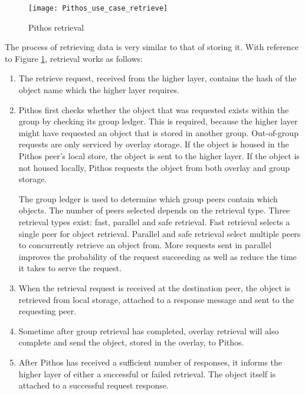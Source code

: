 \begin{figure}[htbp]
 \centering
 \texttt{[image: Pithos\_use\_case\_retrieve]}
 \caption{Pithos retrieval}
 \label{fig_pithos_retrieval}
\end{figure}
%
The process of retrieving data is very similar to that of storing it. With reference to Figure \ref{fig_pithos_retrieval}, retrieval works as follows:
%
\begin{enumerate}
\item The retrieve request, received from the higher layer, contains the hash of the object name which the higher layer requires.

\item Pithos first checks whether the object that was requested exists within the group by checking its group ledger. This is required, because the higher layer might have requested an object that is stored in another group. Out-of-group requests are only serviced by overlay storage. If the object is housed in the Pithos peer's local store, the object is sent to the higher layer. If the object is not housed locally, Pithos requests the object from both overlay and group storage.

    The group ledger is used to determine which group peers contain which objects. The number of peers selected depends on the retrieval type. Three retrieval types exist: fast, parallel and safe retrieval. Fast retrieval selects a single peer for object retrieval. Parallel and safe retrieval select multiple peers to concurrently retrieve an object from. More requests sent in parallel improves the probability of the request succeeding as well as reduce the time it takes to serve the request.

\item When the retrieval request is received at the destination peer, the object is retrieved from local storage, attached to a response message and sent to the requesting peer.

\item Sometime after group retrieval has completed, overlay retrieval will also complete and send the object, stored in the overlay, to Pithos.

\item After Pithos has received a sufficient number of responses, it informs the higher layer of either a successful or failed retrieval. The object itself is attached to a successful request response.
\end{enumerate}

